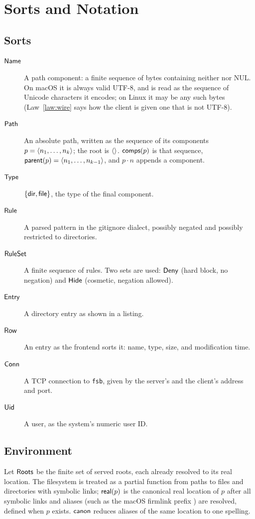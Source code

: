 \section{Sorts and Notation}

\subsection{Sorts}

\begin{description}
  \item[$\mathsf{Name}$] A path component: a finite sequence of bytes containing neither
        \code{/} nor NUL.  On macOS it is always valid UTF-8, and is read as the
        sequence of Unicode characters it encodes; on Linux it may be any such bytes
        (Law~\ref{law:wire} says how the client is given one that is not UTF-8).
  \item[$\mathsf{Path}$] An absolute path, written as the sequence of its components
        $p=\langle n_1,\dots,n_k\rangle$; the root is $\langle \rangle$.  $\mathsf{comps}(p)$ is that
        sequence, $\mathsf{parent}(p)=\langle n_1,\dots,n_{k-1}\rangle$, and $p\cdot n$ appends a
        component.
  \item[$\mathsf{Type}$] $\{\mathsf{dir},\mathsf{file}\}$, the type of the final component.
  \item[$\mathsf{Rule}$] A parsed pattern in the gitignore dialect, possibly negated and
        possibly restricted to directories.
  \item[$\mathsf{RuleSet}$] A finite sequence of rules.  Two sets are used: $\mathsf{Deny}$
        (hard block, no negation) and $\mathsf{Hide}$ (cosmetic, negation allowed).
  \item[$\mathsf{Entry}$] A directory entry as shown in a listing.
  \item[$\mathsf{Row}$] An entry as the frontend sorts it: name, type, size, and
        modification time.
  \item[$\mathsf{Conn}$] A TCP connection to \texttt{fsb}, given by the server's and the
        client's address and port.
  \item[$\mathsf{Uid}$] A user, as the system's numeric user ID.
\end{description}

\subsection{Environment}

Let $\mathsf{Roots}$ be the finite set of served roots, each already resolved to its
real location.  The filesystem is treated as a partial function from paths to
files and directories with symbolic links; $\mathsf{real}(p)$ is the canonical real
location of $p$ after all symbolic links and aliases (such as the macOS
firmlink prefix ) are resolved, defined when $p$
exists.  $\mathsf{canon}$ reduces aliases of the same location to one spelling.

